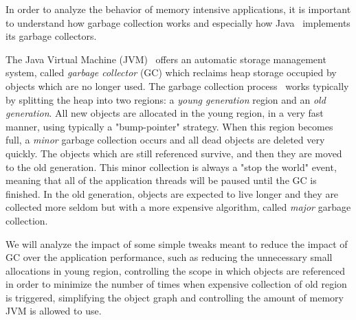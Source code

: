 \documentclass[a4paper,twoside]{article}
\begin{document}
In order to analyze the behavior of memory intensive applications, it is important to understand how garbage collection works and especially how Java~\cite{java} implements its garbage collectors.

The Java Virtual Machine (JVM)~\cite{lindholm:2014} offers an automatic storage management system,
called {\textit{garbage collector} (GC)} which reclaims heap storage occupied by objects which are no longer used.
The garbage collection process~\cite{gc:oracle} works typically by splitting the heap into two regions:
a {\textit{young generation}} region and an {\textit{old generation}}.
All new objects are allocated in the young region, in a very fast manner, using typically a "bump-pointer" strategy.
When this region becomes full,  a {\textit{minor}} garbage collection occurs and all dead objects are deleted very quickly.
The objects which are still referenced survive, and then they are moved to the old generation.
This minor collection is always a "stop the world" event, meaning that all of the application threads will be paused until the GC is finished.
In the old generation, objects are expected to live longer and they are collected more seldom but with a more expensive algorithm, called {\textit{major}} garbage collection.

We will analyze the impact of some simple tweaks meant to reduce the impact of GC over the application performance, such as
reducing the unnecessary small allocations in young region, controlling the scope in which objects are referenced in
order to minimize the number of times when expensive collection of old region is triggered,
simplifying the object graph and controlling the amount of memory JVM is allowed to use.
\end{document}
